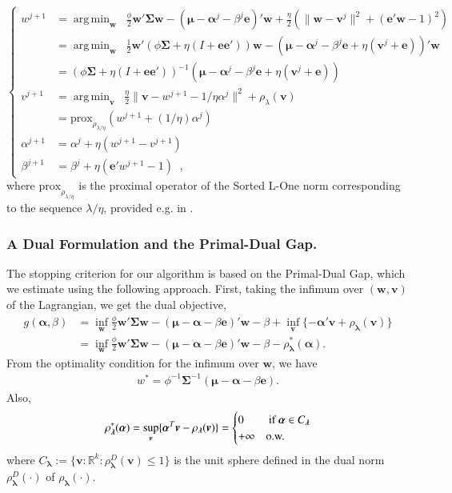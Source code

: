 \documentclass[12pt, a4paper]{article}
\newcommand{\bfw}{\boldsymbol{w} }
\newcommand{\bfmu}{\boldsymbol{\mu} }
\newcommand{\bfSigma}{\boldsymbol{\Sigma} }
\newcommand{\bfv}{\boldsymbol{v}}
\newcommand{\bfe}{\boldsymbol{e}}
\newcommand{\bfalpha}{\boldsymbol{\alpha}}
\newcommand{\bflambda}{\boldsymbol{\lambda}}
\newcommand{\prox}{\text{prox}}
\newcommand{\R}{\mathbb{R}}
\DeclareMathOperator*{\argmin}{arg\,min}
\begin{document}
\begin{equation}
  \begin{cases}
 w^{j+1} &= \argmin_{\bfw} \;\; \frac{\phi}{2} \bfw'\bfSigma \bfw - (\bfmu - \bfalpha^j - \beta^j \bfe)'\bfw + \frac{\eta}{2} (\|\bfw-\bfv^j\|^2 + (\bfe'\bfw-1)^2) \\
 &= \argmin_{\bfw} \;\; \frac{1}{2} \bfw' ( \phi \bfSigma + \eta (I + \bfe\bfe')) \bfw - (\bfmu - \bfalpha^j - \beta^j \bfe + \eta ( \bfv^j + \bfe))'\bfw \\
 &=  ( \phi \bfSigma + \eta (I + \bfe\bfe'))^{-1} (\bfmu - \bfalpha^j -\beta^j \bfe + \eta ( \bfv^j + \bfe)) \\
 v^{j+1} &= \argmin_{\bfv} \;\; \frac{\eta}{2} \|\bfv-w^{j+1} - 1/\eta \alpha^j \|^2  + \rho_\lambda(\bfv)  \\
 &= \prox_{\rho_{\lambda/\eta}} (w^{j+1} + (1/\eta) \alpha^j )\\
    \alpha^{j+1} &= \alpha^j + \eta( w^{j+1} - v^{j+1} ) \\
    \beta^{j+1} &= \beta^j + \eta( \bfe' w^{j+1} - 1) \;\;,
  \end{cases}
\end{equation}
\vspace{.5cm}
where $\prox_{\rho_{\lambda/\eta}}$ is the proximal operator of the Sorted L-One norm corresponding to the sequence $\lambda/\eta$, provided e.g. in \cite{Bogdan2013,Bogdan2015}. 


\subsubsection*{A Dual Formulation and the Primal-Dual Gap.} %

The stopping criterion for our algorithm is based on the Primal-Dual Gap, which we estimate using the following approach. First, taking the infimum over $(\bfw,\bfv)$ of the Lagrangian, we get the dual objective,
$$
\begin{aligned}
  g(\bfalpha,\beta)
 & = \inf_{\bfw} \frac{\phi}{2} \bfw' \bfSigma \bfw - (\bfmu - \bfalpha - \beta \bfe)' \bfw -\beta + \inf_{\bfv} \{ -\bfalpha'\bfv + \rho_{\bflambda}(\bfv) \} \\
 & = \inf_{\bfw} \frac{\phi}{2} \bfw' \bfSigma \bfw - (\bfmu - \bfalpha - \beta \bfe)' \bfw -\beta - \rho_{\bflambda}^*(\bfalpha).
\end{aligned}
$$
From the optimality condition for the infimum over $\bfw$, we have
\begin{gather}\label{eq:opt1}
 w^* = \phi^{-1}\bfSigma^{-1}(\bfmu - \bfalpha - \beta \bfe) .
\end{gather}
Also,
$$
\rho_{\bflambda}^* (\bfalpha) =\sup_{\bfv} \{ \bfalpha^T \bfv - \rho_{\bflambda}(\bfv) \}
= \begin{cases} 0 & \text{ if $ \bfalpha \in C_{\bflambda} $} \\
  +\infty & \text{o.w.}
\end{cases}
$$
where $C_{\bflambda} := \{\bfv : \R^k: \rho_{\bflambda}^D(\bfv) \le 1 \}$ is the unit
sphere defined in the dual norm $\rho_{\bflambda}^D(\cdot)$ of
$\rho_{\bflambda}(\cdot)$.
\end{document}
